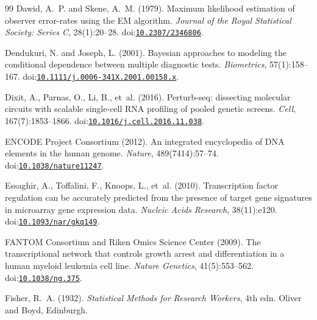 \documentclass[11pt,a4paper]{article}
\begin{document}
\begin{thebibliography}{99}
Dawid, A.~P. and Skene, A.~M. (1979).
\newblock Maximum likelihood estimation of observer error-rates using the {EM} algorithm.
\newblock \emph{Journal of the Royal Statistical Society: Series C}, 28(1):20--28.
\newblock doi:\href{https://doi.org/10.2307/2346806}{\nolinkurl{10.2307/2346806}}.

Dendukuri, N. and Joseph, L. (2001).
\newblock Bayesian approaches to modeling the conditional dependence between multiple diagnostic tests.
\newblock \emph{Biometrics}, 57(1):158--167.
\newblock doi:\href{https://doi.org/10.1111/j.0006-341X.2001.00158.x}{\nolinkurl{10.1111/j.0006-341X.2001.00158.x}}.

Dixit, A., Parnas, O., Li, B., et~al. (2016).
\newblock Perturb-seq: dissecting molecular circuits with scalable single-cell {RNA} profiling of pooled genetic screens.
\newblock \emph{Cell}, 167(7):1853--1866.
\newblock doi:\href{https://doi.org/10.1016/j.cell.2016.11.038}{\nolinkurl{10.1016/j.cell.2016.11.038}}.

{ENCODE Project Consortium} (2012).
\newblock An integrated encyclopedia of {DNA} elements in the human genome.
\newblock \emph{Nature}, 489(7414):57--74.
\newblock doi:\href{https://doi.org/10.1038/nature11247}{\nolinkurl{10.1038/nature11247}}.

Essaghir, A., Toffalini, F., Knoops, L., et~al. (2010).
\newblock Transcription factor regulation can be accurately predicted from the presence of target gene signatures in microarray gene expression data.
\newblock \emph{Nucleic Acids Research}, 38(11):e120.
\newblock doi:\href{https://doi.org/10.1093/nar/gkq149}{\nolinkurl{10.1093/nar/gkq149}}.

{FANTOM Consortium and Riken Omics Science Center} (2009).
\newblock The transcriptional network that controls growth arrest and differentiation in a human myeloid leukemia cell line.
\newblock \emph{Nature Genetics}, 41(5):553--562.
\newblock doi:\href{https://doi.org/10.1038/ng.375}{\nolinkurl{10.1038/ng.375}}.

Fisher, R.~A. (1932).
\newblock \emph{Statistical Methods for Research Workers}, 4th edn.
\newblock Oliver and Boyd, Edinburgh.


\end{thebibliography}
\end{document}
